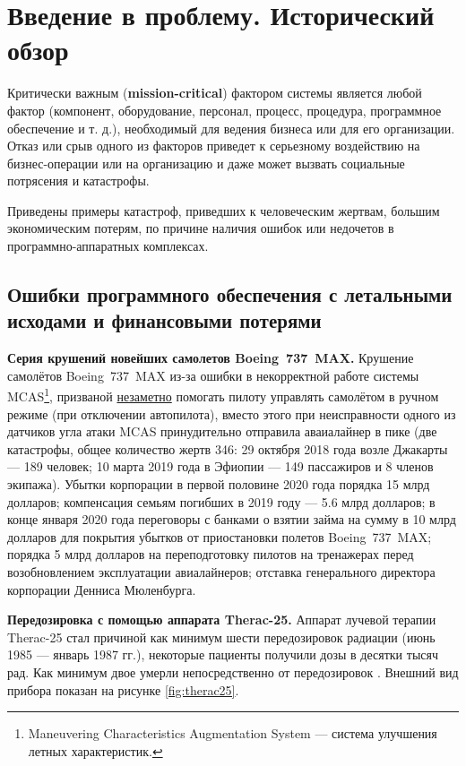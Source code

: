 \chapter{Введение в проблему. Исторический обзор}\label{ch:ch1}

Критически важным (\textbf{mission-critical}) фактором системы является любой фактор
(компонент, оборудование, персонал, процесс, процедура, программное обеспечение и т. д.),
необходимый для ведения бизнеса или для его организации.
Отказ или срыв одного из факторов приведет к серьезному воздействию на бизнес-операции или на организацию
и даже может вызвать социальные потрясения и катастрофы.

Приведены примеры катастроф, приведших к человеческим жертвам, большим экономическим потерям,
по причине наличия ошибок или недочетов в программно-аппаратных комплексах.


\section{Ошибки программного обеспечения с летальными исходами и финансовыми потерями}

\textbf{Серия крушений новейших самолетов Boeing~737~MAX.}
Крушение самолётов Boeing~737~MAX из-за ошибки в некорректной работе системы MCAS\footnote{Maneuvering Characteristics Augmentation System ---
    система улучшения летных характеристик.},
призваной \underline{незаметно} помогать пилоту управлять самолётом в ручном режиме (при отключении автопилота),
вместо этого при неисправности одного из датчиков угла атаки MCAS принудительно отправила аваиалайнер в пике
(две катастрофы, общее количество жертв 346:
    29 октября 2018 года возле Джакарты --- 189 человек;
    10 марта 2019 года в Эфиопии --- 149 пассажиров и 8 членов экипажа).
Убытки корпорации в первой половине 2020 года порядка 15 млрд долларов;
компенсация семьям погибших в 2019 году --- 5.6 млрд долларов;
в конце января 2020 года переговоры с банками о взятии займа на сумму в 10 млрд долларов для покрытия убытков от приостановки полетов Boeing~737~MAX;
порядка 5 млрд долларов на переподготовку пилотов на тренажерах перед возобновлением эксплуатации авиалайнеров;
отставка генерального директора корпорации Денниса Мюленбурга.


\textbf{Передозировка с помощью аппарата Therac-25.}
Аппарат лучевой терапии Therac-25 стал причиной как минимум шести передозировок радиации (июнь 1985 --- январь 1987 гг.),
некоторые пациенты получили дозы в десятки тысяч рад. Как минимум двое умерли непосредственно от передозировок \cite{journal:computer:1993:therac25}.
Внешний вид прибора показан на рисунке \ref{fig:therac25}.

